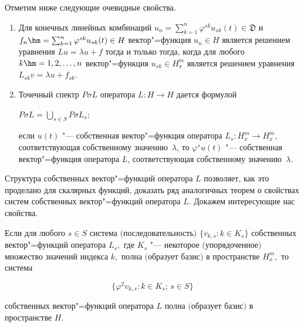 Отметим ниже следующие очевидные свойства.



\begin{enumerate}

\item[1.] Для конечных линейных комбинаций $u_n=\sum _{k=1}^n{\varphi^{sk}u_{sk}(t)}\in\mathfrak{D}$ и $f_n\hm =\sum_{k=1}^n{\varphi^{sk}u_{sk}(t)}\in H$  вектор"=функция $u_n\in H$ является решением уравнения $Lu=\lambda u+f$ тогда и только тогда, когда для любого $k\hm =1,2,\dots,n$ вектор"=функция $u_{sk}\in H_x^m$ является решением уравнения $L_{sk}v=\lambda u+f_{sk}$.



\item[2.] Точечный спектр $P\sigma L$ оператора $L:H\to H$ дается формулой 



\centerline{$P\sigma L=\bigcup\limits _{s\in S}{P\sigma L_s};$}



если $u(t)$ "--- собственная вектор"=функция оператора $L_s:H_x^m\to H_x^m$, соответствующая собственному значению~$\lambda$, то $\varphi^su(t)$ "--- собственная вектор"=функция оператора $L$, соответствующая собственному значению~$\lambda$.

\end{enumerate}



Структура собственных вектор"=функций оператора $L$ позволяет, как это проделано для скалярных функций, доказать ряд аналогичных теорем о свойствах систем собственных вектор"=функций оператора $L$. Докажем интересующие нас свойства.



\smallskip



\hypertarget{korn:th:2}{}



\begin{theorem}[2]Если для любого $s\in S$ система $($последовательность$)$ $\{v_{k,s}:k\in K_s\}$ собственных вектор"=функций оператора $L_s,$ где $K_s$ "--- некоторое $($упорядоченное$)$ множество значений индекса $k,$ полна $($образует базис$)$ в пространстве $H_x^m,$ то система

\begin{equation}

\label{kor:eq1.7}

\{\varphi^2v_{k,s}:k\in K_s;\,s\in S\}

\end{equation}

собственных вектор"=функций оператора $L$ полна $($образует базис$)$ в пространстве $H.$

\end{theorem}



